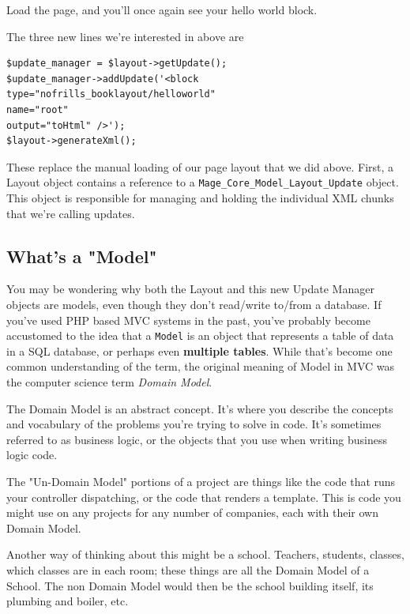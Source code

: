 \documentclass[oneside]{book}
\begin{document}
Load the page, and you'll once again see your hello world block.

The three new lines we're interested in above are 

\begin{lstlisting}
$update_manager = $layout->getUpdate();         
$update_manager->addUpdate('<block 
type="nofrills_booklayout/helloworld" 
name="root" 
output="toHtml" />');           
$layout->generateXml();

\end{lstlisting}


These replace the manual loading of our page layout that we did above.  First, a Layout object contains a reference to a \footnotesize\texttt{Mage\_Core\_Model\_Layout\_Update} \normalsize  object.  This object is responsible for managing and holding the individual XML chunks that we're calling updates.

\subsection{What's a "Model"}

You may be wondering why both the Layout and this new Update Manager objects are models, even though they don't read/write to/from a database.  If you've used PHP based MVC systems in the past, you've probably become accustomed to the idea that a \footnotesize\texttt{Model} \normalsize  is an object that represents a table of data in a SQL database, or perhaps even \textbf{multiple tables}.  While that's become one common understanding of the term, the original meaning of Model in MVC was the computer science term \emph{Domain Model}.

The Domain Model is an abstract concept.  It's where you describe the concepts and vocabulary of the problems you're trying to solve in code.  It's sometimes referred to as business logic, or the objects that you use when writing business logic code.

The "Un-Domain Model" portions of a project are things like the code that runs your controller dispatching, or the code that renders a template.  This is code you might use on any projects for any number of companies, each with their own Domain Model.  

Another way of thinking about this might be a school.  Teachers, students, classes, which classes are in each room; these things are all the Domain Model of a School.  The non Domain Model would then be the school building itself, its plumbing and boiler, etc.
\end{document}
